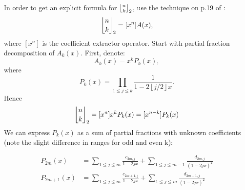 \documentclass[a4paper]{amsart}
\newcommand{\mStirling}[0]{\genfrac{\lfloor}{\rfloor}{0pt}{}}
\newcommand{\floor}[1]{\left\lfloor #1 \right\rfloor}
\begin{document}
In order to get an explicit formula for $\mStirling{n}{k}_2$, use the technique on p.19 of \cite{wilfGeneratingfunctionologyThirdEdition2005}:
$$
\mStirling{n}{k}_2 = [x^n]A(x),
$$
where $[x^n]$ is the coefficient extractor operator. Start with partial fraction decomposition of $A_k(x)$. First, denote:
$$
A_k(x) = x^kP_k(x),
$$
where
$$
P_k(x) = \prod_{1 \leq j \leq k}\frac{1}{1-2\floor{j/2}x}.
$$
Hence
\begin{equation}\label{znk-coef}
\mStirling{n}{k}_2 = [x^n]x^kP_k(x) = [x^{n-k}]P_k(x)
\end{equation}
We can express $P_k(x)$ as a sum of partial fractions with unknown coefficients (note the slight difference in ranges for odd and even k):

\begin{equation}\label{pkx}
    \begin{aligned}
    P_{2m}(x) &= \sum_{1 \leq j \leq m} \frac{c_{2m,j}}{1-2jx} + \sum_{1 \leq j \leq m-1} \frac{d_{2m,j}}{(1-2jx)^2} \\
    P_{2m+1}(x) &= \sum_{1 \leq j \leq m} \frac{c_{2m+1,j}}{1-2jx} + \sum_{1 \leq j \leq m} \frac{d_{2m+1,j}}{(1-2jx)^2}
    \end{aligned}
\end{equation}
\end{document}
